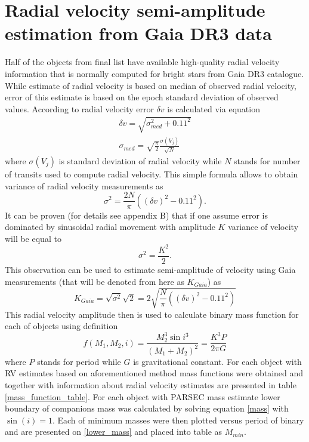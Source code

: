 \documentclass{pracalicmgr}
\begin{document}
\section{Radial velocity semi-amplitude estimation from Gaia DR3 data}
Half of the objects from final list have available high-quality radial velocity information that is normally computed for bright stars from Gaia DR3 catalogue. While estimate of radial velocity 
is based on median of observed radial velocity, error of this estimate is based on the epoch standard deviation of observed values. According to \citep{katz_gaia_2022} radial velocity error $\delta v$ 
is calculated via equation
\begin{align}
    \delta v=\sqrt{\sigma_{med}^2+0.11^2}\\
    \sigma_{med}=\sqrt{\frac{\pi}{2}}\frac{\sigma(V_j)}{\sqrt{N}}
\end{align}
where $\sigma(V_j)$ is standard deviation of radial velocity while $N$ stands for number of transits used to compute radial velocity. This simple formula allows to obtain variance of 
radial velocity measurements as 
\begin{equation}
    \sigma^2=\frac{2N}{\pi}\left((\delta v)^2-0.11^2\right).
\end{equation}
It can be proven (for details see appendix B) that if one assume error is dominated by sinusoidal radial movement with amplitude $K$ 
variance of velocity will be equal to
\begin{equation}
    \sigma^2=\frac{K^2}{2}.
\end{equation}
This observation can be used to estimate semi-amplitude of velocity using Gaia measurements (that will be denoted from here as $K_{Gaia}$) as 
\begin{equation}
    K_{Gaia}=\sqrt{\sigma^2}\sqrt{2}=2\sqrt{\frac{N}{\pi}\left((\delta v)^2-0.11^2\right)}
\end{equation}
This radial velocity amplitude then is used to calculate binary mass function for each of objects using definition 
\begin{equation}\label{mass}
    f(M_1,M_2,i)=\frac{M_2^3 \sin{i}^3}{(M_1+M_2)^2}=\frac{K^3 P}{2\pi G}
\end{equation}
where $P$ stands for period while $G$ is gravitational constant. For each object with RV estimates based on aforementioned method mass functions were obtained and together with
information about radial velocity estimates are presented in table \ref{mass_function_table}.
For each object with PARSEC mass estimate lower boundary of companions mass was calculated by solving equation \ref{mass}
with  $\sin{(i)}=1$. Each of minimum masses were then plotted versus period of binary and are presented on \ref{lower_mass}
and placed into table as $M_{min}$.
\end{document}

